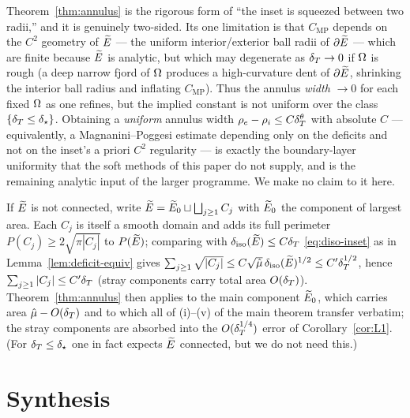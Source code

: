 \begin{remark}
\label{rem:nonuniform}
Theorem~\ref{thm:annulus} is the rigorous form of ``the inset is squeezed
between two radii,'' and it is genuinely two-sided. Its one limitation is
that $C_{\mathrm{MP}}$ depends on the $C^2$ geometry of $\widetilde E$ --- the
uniform interior/exterior ball radii of $\partial\widetilde E$ --- which are finite
because $\widetilde E$ is analytic, but which may degenerate as $\delta_T\to0$ if $\Omega$
is rough (a deep narrow fjord of $\Omega$ produces a high-curvature dent of
$\partial\widetilde E$, shrinking the interior ball radius and inflating
$C_{\mathrm{MP}}$). Thus the annulus \emph{width} $\to0$ for each fixed
$\Omega$ as one refines, but the implied constant is not uniform over the class
$\{\delta_T\le\delta_\star\}$. Obtaining a \emph{uniform} annulus width
$\rho_e-\rho_i\le C\delta_T^{\theta}$ with absolute $C$ --- equivalently, a
Magnanini--Poggesi estimate depending only on the deficits and not on the
inset's a priori $C^2$ regularity --- is exactly the boundary-layer
uniformity that the soft methods of this paper do not supply, and is the
remaining analytic input of the larger programme. We make no claim to it
here.
\end{remark}

\begin{remark}\label{rem:components}
If $\widetilde E$ is not connected, write $\widetilde E=\widetilde E_0\sqcup\bigsqcup_{j\ge1}C_j$
with $\widetilde E_0$ the component of largest area. Each $C_j$ is itself a smooth
domain and adds its full perimeter $P(C_j)\ge2\sqrt{\pi|C_j|}$ to
$P(\widetilde E)$; comparing with $\delta_{\mathrm{iso}}(\widetilde E)\le C\delta_T$
\eqref{eq:diso-inset} as in Lemma~\ref{lem:deficit-equiv} gives
$\sum_{j\ge1}\sqrt{|C_j|}\le C\sqrt{\hat\mu}\,\delta_{\mathrm{iso}}(\widetilde E)^{1/2}\le
C'\delta_T^{1/2}$, hence $\sum_{j\ge1}|C_j|\le C'\delta_T$ \textup{(}stray components
carry total area $O(\delta_T)$\textup{)}. Theorem~\ref{thm:annulus} then applies
to the main component $\widetilde E_0$, which carries area
$\hat\mu-O(\delta_T)$ and to which all of (i)--(v) of the main theorem transfer
verbatim; the stray components are absorbed into the $O(\delta_T^{1/4})$ error of
Corollary~\ref{cor:L1}. \textup{(}For $\delta_T\le\delta_\star$ one in fact
expects $\widetilde E$ connected, but we do not need this.\textup{)}
\end{remark}

\section{Synthesis}\label{sec:synthesis}

